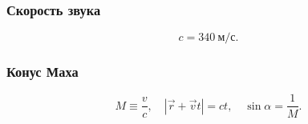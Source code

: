 \documentclass[12pt, a4paper]{article}
\begin{document}
\subsubsection*{Скорость звука}
\[
c = 340\ \mathrm{м/с}.
\]

\subsubsection*{Конус Маха}
\[
M \equiv \frac{v}{c},
\quad
|\vec{r} + \vec{v}t| = ct,
\quad
\sin\alpha = \frac{1}{M}.
\]
\end{document}
